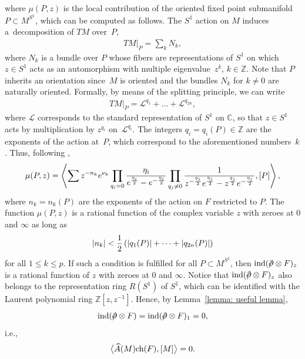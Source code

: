 \documentclass[pdftex]{sigma}
\newcommand{\A}{\mbox{$\widehat A$}}
\newcommand{\ind}{\mbox{\rm ind}}
\newcommand{\ch}{\mbox{\rm ch}}
\newcommand{\dirac}{/\kern-5pt\partial}
\numberwithin{equation}{section}
\begin{document}
where $\mu(P,z)$ is the local contribution of the oriented f\/ixed point submanifold $P\subset M^{S^1}$, which can be computed as follows. The $S^1$ action on $M$ induces a~decomposition of $TM$ over~$P$,
\begin{gather}
TM\vert_{P}= \sum_{k} N_k,\label{eq: decomposition1}
\end{gather}
where $N_k$ is a bundle over $P$ whose f\/ibers are representations of $S^1$ on which $z\in S^1$ acts as an automorphism with multiple eigenvalue~$z^k$, $k\in\mathbb{Z}$. Note that $P$ inherits an orientation since~$M$ is oriented and the bundles $N_k$ for $k\not=0$ are naturally oriented. Formally, by means of the splitting principle, we can write
\begin{gather}
 TM\vert_{P}= \mathcal{L}^{q_1}+\dots + \mathcal{L}^{q_{2n}},\label{eq: decomposition2}
\end{gather}
where $\mathcal{L}$ corresponds to the standard representation of $S^1$ on $\mathbb{C}$, so that $z\in S^1$ acts by multiplication by $z^{q_i}$ on~$\mathcal{L}^{q_i}$. The integers $q_i=q_i(P)\in \mathbb{Z}$ are the exponents of the action at~$P$, which correspond to the aforementioned numbers~$k$. Thus, following \cite[p.~67]{Hirzebruch},
\begin{gather*}\mu(P,z)= \left\langle \sum z^{-n_k}e^{\nu_k} \prod_{q_i=0}
{ \eta_i \over e^{\eta_i\over2}-e^{-{\eta_i\over2}}} \prod_{q_j\not = 0}
{1 \over z^{-{q_j\over2}}e^{\eta_j\over2}-z^{q_j\over2}e^{-{\eta_j\over2}}},[P]\right\rangle ,
\end{gather*}
where $n_k=n_k(P)$ are the exponents of the action on $F$ restricted to $P$. The function $\mu(P,z)$ is a rational function of the complex variable $z$ with zeroes at $0$ and $\infty$ as long as
\begin{gather}
|n_k|< {1\over 2}\left(|q_1(P)|+\dots + |q_{2n}(P)|\right)\label{eq: fundamental inequality}
\end{gather}
for all $1\leq k\leq p$. If such a condition is fulf\/illed for all $P\subset M^{S^1}$, then $\ind(\dirac\otimes F)_z$ is a rational function of $z$ with zeroes at $0$ and $\infty$. Notice that $\ind(\dirac\otimes F)_z$ also belongs to the representation ring $R(S^1)$ of $S^1$, which can be identif\/ied with the Laurent polynomial ring $\mathbb{Z}[z, z^{-1}]$. Hence, by Lemma~\ref{lemma: useful lemma},
\begin{gather*}\ind(\dirac\otimes F)=\ind(\dirac\otimes F)_1 =0,\end{gather*}
i.e.,
\begin{gather*}\big\langle \A(M)\ch(F),[M]\big\rangle =0.\end{gather*}
\end{document}
